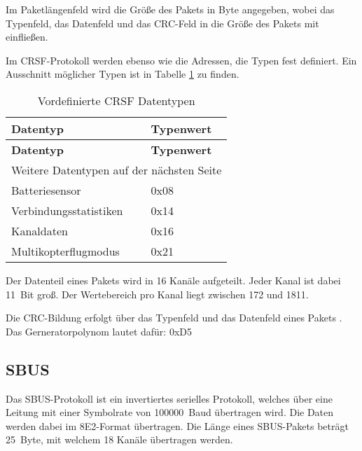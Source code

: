 Im Paketlängenfeld wird die Größe des Pakets in Byte angegeben, wobei das Typenfeld, das Datenfeld und das \ac{CRC}-Feld in die Größe des Pakets mit einfließen. \cite{cleanflightCrsf}

Im CRSF-Protokoll werden ebenso wie die Adressen, die Typen fest definiert. Ein Ausschnitt möglicher Typen ist in Tabelle \ref{table:crsfTyp} zu finden.

\begin{longtable}[c]{|l|l|}
    \caption{Vordefinierte CRSF Datentypen \cite{cleanflightCrsfP}}
    \label{table:crsfTyp}\\
    \hline
    \textbf{Datentyp} & \textbf{Typenwert}\\
    \hline
    \hline
    \endfirsthead

    \hline
    \textbf{Datentyp} & \textbf{Typenwert}\\
    \hline
    \hline
    \endhead

    \hline
    \multicolumn{2}{|r|}{Weitere Datentypen auf der nächsten Seite}\\
    \hline
    \endfoot

    \hline
    \endlastfoot
    
    Batteriesensor & 0x08 \\
    \hline
    Verbindungsstatistiken & 0x14 \\
    \hline
    Kanaldaten & 0x16 \\
    \hline
    Multikopterflugmodus & 0x21 \\
\end{longtable}

Der Datenteil eines Pakets wird in 16 Kanäle aufgeteilt. Jeder Kanal ist dabei 11~Bit groß. Der Wertebereich pro Kanal liegt zwischen 172 und 1811. \cite{cleanflightCrsf}

Die \ac{CRC}-Bildung erfolgt über das Typenfeld und das Datenfeld eines Pakets \cite{cleanflightCrsf}. Das Gerneratorpolynom lautet dafür: 0xD5 \cite{cleanflightCRC}

\subsection{SBUS}

Das SBUS-Protokoll ist ein invertiertes serielles Protokoll, welches über eine Leitung mit einer Symbolrate von 100000~Baud übertragen wird. Die Daten werden dabei im 8E2-Format übertragen. Die Länge eines SBUS-Pakets beträgt 25~Byte, mit welchem 18 Kanäle übertragen werden. \cite{BolderFlight}

